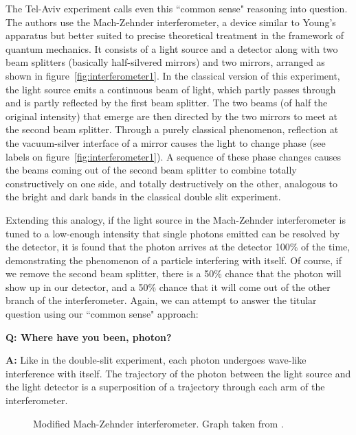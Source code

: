 \documentclass{article}
\newcommand{\Q}{\bfseries Q: }
\newcommand{\A}{\par\textbf{A:} \normalfont}
\begin{document}
The Tel-Aviv experiment calls even this ``common sense" reasoning into 
question\cite{lundeen,danan}. The authors use the Mach-Zehnder interferometer, 
a device similar to Young's apparatus but better suited to precise theoretical 
treatment in the framework of quantum mechanics\cite{lahiri}. It consists of a 
light source and a detector along with two beam splitters (basically 
half-silvered mirrors) and two mirrors, arranged as shown in 
figure~\ref{fig:interferometer1}. In the classical version of this experiment, 
the light source emits a continuous beam of light, which partly passes through 
and is partly reflected by the first beam splitter. The two beams (of half the 
original intensity) that emerge are then directed by the two mirrors to meet at 
the second beam splitter. Through a purely classical phenomenon, reflection at 
the vacuum-silver interface of a mirror causes the light to change phase (see 
labels on figure~\ref{fig:interferometer1}). A sequence of these phase changes 
causes the beams coming out of the second beam splitter to combine totally 
constructively on one side, and totally destructively on the other, analogous 
to the bright and dark bands in the classical double slit experiment. 

Extending this analogy, if the light source in the Mach-Zehnder interferometer 
is tuned to a low-enough intensity that single photons emitted can be resolved 
by the detector, it is found that the photon arrives at the detector 100\% of 
the time, demonstrating the phenomenon of a particle interfering with 
itself\cite{lahiri}. Of course, if we remove the second beam splitter, there is 
a 50\% chance that the photon will show up in our detector, and a 50\% chance 
that it will come out of the other branch of the interferometer. Again, we can 
attempt to answer the titular question using our ``common sense" approach: 

\begin{framed}

	\Q Where have you been, photon?  

	\A Like in the double-slit experiment, each photon undergoes wave-like 
	interference with itself. The trajectory of the photon between the 
	light source and the light detector is a superposition of a trajectory 
	through each arm of the interferometer. 

\end{framed}


\begin{figure}
	\centering
	
	\caption{Modified Mach-Zehnder interferometer. Graph taken from 
	\cite{danan}.}
	\label{fig:danan-1a}
\end{figure}
\end{document}
